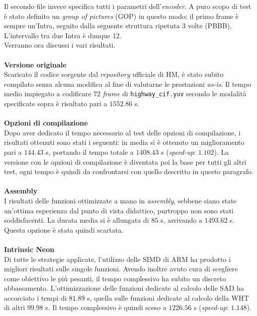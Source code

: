 Il secondo file invece specifica tutti i parametri dell'\emph{encoder}. A puro 
scopo di test è stato definito un \textit{group of pictures} (GOP) in questo 
modo: il primo frame è sempre un'Intra, seguito dalla seguente struttura 
ripetuta 3 volte (PBBB). L'intervallo tra due Intra è dunque 12. \\
Verranno ora discussi i vari risultati. 
\\ \\
\textbf{Versione originale}\\
  Scaricato il codice sorgente dal \emph{repository} ufficiale di HM, è stato 
  subito compilato senza alcuna modifica al fine di valutarne le prestazioni 
  \emph{as-is}. Il tempo medio impiegato a codificare $72$ \emph{frame} di 
  \verb|highway_cif.yuv| secondo le modalità specificate sopra è risultato pari 
  a $1552.86$ s.
\\ \\
\textbf{Opzioni di compilazione}\\
  Dopo aver dedicato il tempo necessario al test delle opzioni di compilazione, 
  i risultati ottenuti sono stati i seguenti: in media si è ottenuto un 
  miglioramento pari a $144.43$ s, portando il tempo totale a $1408.43$ s 
  (\textit{speed-up}: $1.102$).
  La versione con le opzioni di compilazione è diventata poi la base per tutti 
  gli altri test, ogni tempo è quindi da confrontarsi con quello descritto in 
  questo paragrafo.
\\ \\
\textbf{Assembly}\\
  I risultati delle funzioni ottimizzate a mano in \emph{assembly}, sebbene 
  siano state un'ottima esperienza dal punto di vista didattico, purtroppo non 
  sono stati soddisfacenti. 
  La durata media si è allungata di $85$ s, arrivando a $1493.62$ s. Questa 
  opzione è stata quindi scartata.
\\ \\
\textbf{Intrinsic Neon}\\
  Di tutte le strategie applicate, l'utilizzo delle SIMD di ARM ha prodotto i 
  migliori risultati sulle singole funzioni. Avendo inoltre avuto cura di 
  scegliere come obiettivo le più pesanti, il tempo complessivo ha subito un 
  discreto abbassamento.
  L'ottimizzazione delle funzioni dedicate al calcolo delle SAD ha accorciato i 
  tempi di $81.89$ s, quella sulle funzioni dedicate al calcolo della WHT di 
  altri $99.98$ s. Il tempo complessivo è quindi sceso a $1226.56$ s   
  (\textit{speed-up}: $1.148$).
  
